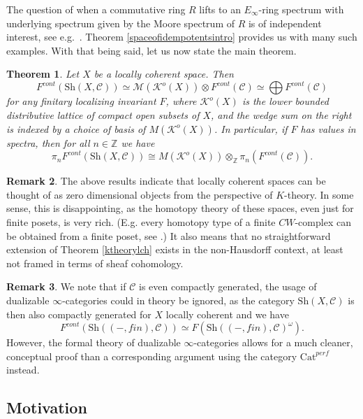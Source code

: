 \documentclass[10pt]{amsart}
\newtheorem{theorem}{Theorem}[section]
\theoremstyle{definition}
\newtheorem{remark}[theorem]{Remark}
\begin{document}
The question of when a commutative ring $R$ lifts to an $E_\infty$-ring spectrum with underlying spectrum given by the Moore spectrum of $R$ is of independent interest, see e.g.\ \cite{carmeli2024mapssphericalgrouprings}. Theorem \ref{spaceofidempotentsintro} provides us with many such examples. With that being said, let us now state the main theorem.


\begin{theorem} \label{ktheorylocallycoherent}
Let $X$ be a locally coherent space. Then
$$F^{cont}( \mathrm{Sh}(X,\mathcal{C})) \simeq \mathcal{M}(\mathcal{K}^o(X)) \otimes F^{cont}(\mathcal{C}) \simeq \bigoplus F^{cont}(\mathcal{C})$$
for any finitary localizing invariant $F$, where $\mathcal{K}^o(X)$ is the lower bounded distributive lattice of compact open subsets of $X$, and the wedge sum on the right is indexed by a choice of basis of $M(\mathcal{K}^o(X))$. In particular, if $F$ has values in spectra, then for all $n \in \mathbb{Z}$ we have
$$ \pi_n F^{cont}( \mathrm{Sh}(X,\mathcal{C})) \cong M(\mathcal{K}^o(X)) \otimes_\mathbb{Z} \pi_n(F^{cont}(\mathcal{C}) ).$$
\end{theorem}


\begin{remark}
The above results indicate that locally coherent spaces can be thought of as zero dimensional objects from the perspective of $K$-theory. In some sense, this is disappointing, as the homotopy theory of these spaces, even just for finite posets, is very rich. (E.g. every homotopy type of a finite $CW$-complex can be obtained from a finite poset, see \cite{McCord_finite_topological}.) It also means that no straightforward extension of Theorem \ref{ktheorylch} exists in the non-Hausdorff context, at least not framed in terms of sheaf cohomology.
\end{remark}


\begin{remark}
We note that if $\mathcal{C}$ is even compactly generated, the usage of dualizable $\infty$-categories could in theory be ignored, as the category $\mathrm{Sh}(X,\mathcal{C})$ is then also compactly generated for $X$ locally coherent and we have
$$ F^{cont}( \mathrm{Sh}((-,fin),\mathcal{C})) \simeq F( \mathrm{Sh}((-,fin),\mathcal{C})^{\omega}).$$
However, the formal theory of dualizable $\infty$-categories allows for a much cleaner, conceptual proof than a corresponding argument using the category $\mathrm{Cat}^{perf}$ instead.
\end{remark}

\subsection{Motivation}
\end{document}
